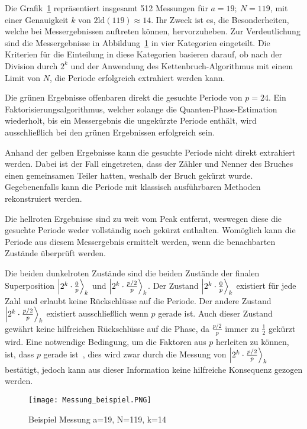\vspace{1em}

Die Grafik~\ref{fig:shor_measure} repräsentiert insgesamt 512 Messungen für \(a=19;~N=119\), 
mit einer Genauigkeit \(k\) von \(2\text{ld}(119) \approx 14 \). 
Ihr Zweck ist es, die Besonderheiten, 
welche bei Messergebnissen auftreten können, hervorzuheben.
Zur Verdeutlichung sind die Messergebnisse in Abbildung~\ref{fig:shor_measure} in vier Kategorien eingeteilt.
Die Kriterien für die Einteilung in diese Kategorien basieren darauf, 
ob nach der Division durch \(2^k\) und 
der Anwendung des Kettenbruch-Algorithmus mit einem Limit von \(N\), 
die Periode erfolgreich extrahiert werden kann.

Die grünen Ergebnisse offenbaren direkt die gesuchte Periode von \(p = 24\).
Ein Faktorisierungsalgorithmus, welcher solange die Quanten-Phase-Estimation wiederholt, 
bis ein Messergebnis die ungekürzte Periode enthält, 
wird ausschließlich bei den grünen Ergebnissen erfolgreich sein.

Anhand der gelben Ergebnisse kann die gesuchte Periode nicht direkt extrahiert werden.
Dabei ist der Fall eingetreten, dass der Zähler und Nenner des Bruches einen gemeinsamen Teiler hatten, 
weshalb der Bruch gekürzt wurde.
Gegebenenfalls kann die Periode mit klassisch ausführbaren Methoden rekonstruiert werden.

Die hellroten Ergebnisse sind zu weit vom Peak entfernt,
weswegen diese die gesuchte Periode weder vollständig noch gekürzt enthalten.
Womöglich kann die Periode aus diesem Messergebnis ermittelt werden, 
wenn die benachbarten Zustände überprüft werden.

Die beiden dunkelroten Zustände sind die beiden Zustände der finalen Superposition
\(\ket{2^k \cdot \frac{0}{p}}_k\) und \(\ket{2^k \cdot \frac{p/2}{p}}_k\).
Der Zustand \(\ket{2^k \cdot \frac{0}{p}}_k\) existiert für jede Zahl und erlaubt keine 
Rückschlüsse auf die Periode.
Der andere Zustand \(\ket{2^k \cdot \frac{p/2}{p}}_k\) existiert ausschließlich wenn \(p\) gerade ist.
Auch dieser Zustand gewährt keine hilfreichen Rückschlüsse auf die Phase, 
da \(\frac{p/2}{p}\) immer zu \(\frac{1}{2}\) gekürzt wird.
Eine notwendige Bedingung, um die Faktoren aus \(p\) herleiten zu können, 
ist, dass \(p\) gerade ist~\cite*{Shor_1997}, 
dies wird zwar durch die Messung von \(\ket{2^k \cdot \frac{p/2}{p}}_k\) bestätigt, 
jedoch kann aus dieser Information keine hilfreiche Konsequenz gezogen werden.

\begin{figure} [H]
\caption{Beispiel Messung a=19, N=119, k=14}
\label{fig:shor_measure}
\texttt{[image: Messung\_beispiel.PNG]}
\centering
\end{figure}


